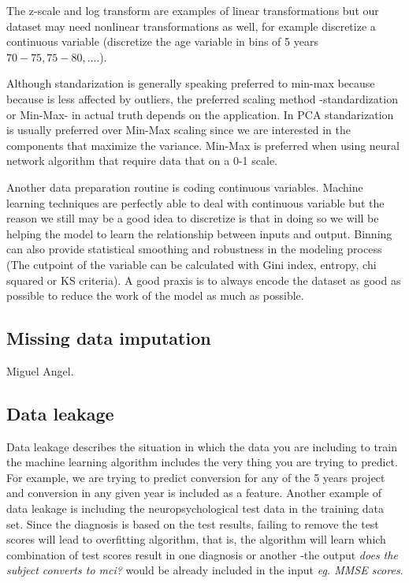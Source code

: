 \documentclass[11pt]{article}
\begin{document}
The z-scale and log transform are examples of linear transformations but our dataset may need nonlinear transformations as well, for example discretize a continuous variable (discretize the age variable in bins of 5 years $70-75, 75-80, ...$.). 

Although standarization is generally speaking preferred to min-max because because is less affected by outliers, the preferred scaling method -standardization or Min-Max- in actual truth depends on the application. In PCA standarization is usually preferred over Min-Max scaling since we are interested in the components that maximize the variance.
Min-Max is preferred when using neural network algorithm that require data that on a 0-1 scale.

Another data preparation routine is coding continuous variables. Machine learning techniques are perfectly able to deal with continuous variable but the reason we still may be a good idea to discretize is that in doing so we will be helping the model to learn the relationship between inputs and output. Binning can also provide statistical smoothing and robustness in the modeling process (The cutpoint of the variable can be calculated with Gini index, entropy, chi squared or KS criteria).
A good praxis is to always encode the dataset as good as possible to reduce the work of the model as much as possible.

% 
\subsection{Missing data imputation}
\label{sse:miss}
Miguel Angel.


\subsection{Data leakage}
\label{sse:dl}
Data leakage describes the situation in which the data you are including to train the machine learning algorithm includes the very thing you are trying to predict. For example, we are trying to predict conversion for any of the 5 years project and conversion in any given year is included as a feature.
Another example of data leakage is including the neuropsychological test data in the training data set. Since the diagnosis is based on the test results, failing to remove the test scores will lead to overfitting algorithm, that is, the algorithm will learn which combination of test scores result in one diagnosis or another -the output \emph{does the subject converts to mci?} would be already included in the input \emph{eg. MMSE scores}.
\end{document}
